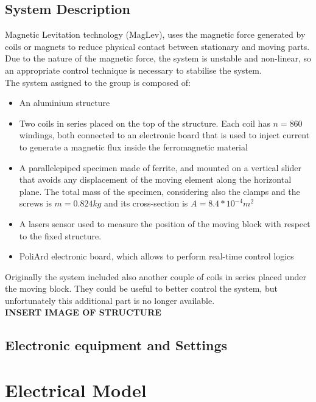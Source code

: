 \documentclass[a4paper, 11pt] {article}
\begin{document}
\subsection{System Description}
Magnetic Levitation technology (MagLev), uses the magnetic force generated by coils or magnets to reduce physical contact between stationary and moving parts. Due to the nature of the magnetic force, the system is unstable and non-linear, so an appropriate control technique is necessary to stabilise the system. \\
The system assigned to the group is composed of: 
\begin{itemize}
\item An aluminium structure 
\item Two coils in series placed on the top of the structure. Each coil has $n = 860$ windings, both connected to an electronic board that is used to inject current to generate a magnetic flux inside the ferromagnetic material 
\item A parallelepiped specimen made of ferrite, and mounted on a vertical slider that avoids any displacement of the moving element along the horizontal plane. The total mass of the specimen, considering also the clamps and the screws is $m = 0.824 kg$ and its cross-section is $A = 8.4*10^{-4} m^{2}$
\item A lasers sensor used to measure the position of the moving block with respect to the fixed structure. 
\item     PoliArd electronic board, which allows to perform real-time control logics 
\end{itemize}

Originally the system included also another couple of coils in series placed under the moving block. They could be useful to better control the system, but unfortunately this additional part is no longer available. \\




    
\textbf{INSERT IMAGE OF STRUCTURE} 
    

   



\subsection{Electronic equipment and Settings}

\section{Electrical Model}
\end{document}
